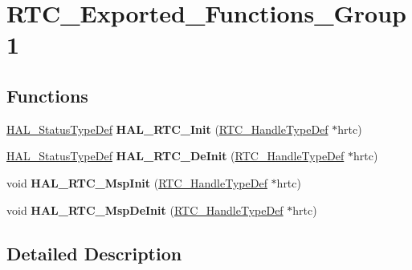 \hypertarget{group___r_t_c___exported___functions___group1}{}\section{R\+T\+C\+\_\+\+Exported\+\_\+\+Functions\+\_\+\+Group1}
\label{group___r_t_c___exported___functions___group1}
\subsection*{Functions}
\begin{DoxyCompactItemize}
\item 
\hyperlink{stm32f4xx__hal__def_8h_a63c0679d1cb8b8c684fbb0632743478f}{H\+A\+L\+\_\+\+Status\+Type\+Def} {\bfseries H\+A\+L\+\_\+\+R\+T\+C\+\_\+\+Init} (\hyperlink{struct_r_t_c___handle_type_def}{R\+T\+C\+\_\+\+Handle\+Type\+Def} $\ast$hrtc)\hypertarget{group___r_t_c___exported___functions___group1_gaa6b53830aa3e2efaf210c0b1d3e5f4a4}{}\label{group___r_t_c___exported___functions___group1_gaa6b53830aa3e2efaf210c0b1d3e5f4a4}

\item 
\hyperlink{stm32f4xx__hal__def_8h_a63c0679d1cb8b8c684fbb0632743478f}{H\+A\+L\+\_\+\+Status\+Type\+Def} {\bfseries H\+A\+L\+\_\+\+R\+T\+C\+\_\+\+De\+Init} (\hyperlink{struct_r_t_c___handle_type_def}{R\+T\+C\+\_\+\+Handle\+Type\+Def} $\ast$hrtc)\hypertarget{group___r_t_c___exported___functions___group1_ga24a8aac7bd6d9bac9f211d24ff6930ec}{}\label{group___r_t_c___exported___functions___group1_ga24a8aac7bd6d9bac9f211d24ff6930ec}

\item 
void {\bfseries H\+A\+L\+\_\+\+R\+T\+C\+\_\+\+Msp\+Init} (\hyperlink{struct_r_t_c___handle_type_def}{R\+T\+C\+\_\+\+Handle\+Type\+Def} $\ast$hrtc)\hypertarget{group___r_t_c___exported___functions___group1_gaee6eddaa309c8c9829f1ca794d8f99c5}{}\label{group___r_t_c___exported___functions___group1_gaee6eddaa309c8c9829f1ca794d8f99c5}

\item 
void {\bfseries H\+A\+L\+\_\+\+R\+T\+C\+\_\+\+Msp\+De\+Init} (\hyperlink{struct_r_t_c___handle_type_def}{R\+T\+C\+\_\+\+Handle\+Type\+Def} $\ast$hrtc)\hypertarget{group___r_t_c___exported___functions___group1_ga8767bc3a4d472d39a688090ab10ba6ce}{}\label{group___r_t_c___exported___functions___group1_ga8767bc3a4d472d39a688090ab10ba6ce}

\end{DoxyCompactItemize}


\subsection{Detailed Description}

